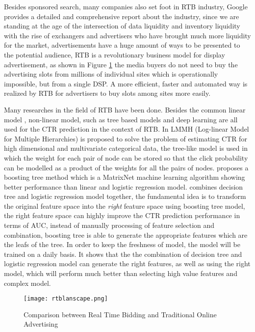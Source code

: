 Besides sponsored search, many companies also set foot in RTB industry, Google provides a detailed and comprehensive report about the industry\cite{google2015}, since we are standing at the age of the intersection of data liquidity and inventory liquidity with the rise of exchangers and advertisers who have brought much more liquidity for the market, advertisements have a huge amount of ways to be presented to the potential audience, RTB is a revolutionary business model for display advertisement, as shown in Figure \ref{fig:ctr} the media buyers do not need to buy the advertising slots from millions of individual sites which is operationally impossible, but from a single DSP. A more efficient, faster and automated way is realized by RTB for advertisers to buy slots among sites more easily. 

Many researches in the field of RTB have been done. Besides the common linear model , non-linear model, such as tree based models and deep learning are all used for the CTR prediction in the context of RTB. In \cite{agarwal2010estimating} LMMH (Log-linear Model for Multiple Hierarchies) is proposed to solve the problem of estimating CTR for high dimensional and multivariate categorical data, the tree-like model is used in which the weight for each pair of node can be stored so that the click probability can be modelled as a product of the weights for all the pairs of nodes. \cite{trofimov2012using} proposes a boosting tree method which is a MatrixNet machine learning algorithm showing better performance than linear and logistic regression model. \cite{he2014practical} combines decision tree and logistic regression model together, the fundamental idea is to transform the original feature space into the \textit{right} feature space using boosting tree model, the right feature space can highly improve the CTR prediction performance in terms of AUC, instead of manually processing of feature selection and combination, boosting tree is able to generate the appropriate features which are the leafs of the tree. In order to keep the freshness of model, the model will be trained on a daily basis. It shows that the the combination of decision tree and logistic regression model can generate the right features, as well as using the right model, which will perform much better than selecting high value features and complex model.

\begin{figure}[h]
\centering
\texttt{[image: rtblanscape.png]}
\caption{Comparison between Real Time Bidding and Traditional Online Advertising}
\label{fig:ctr}
\end{figure}

